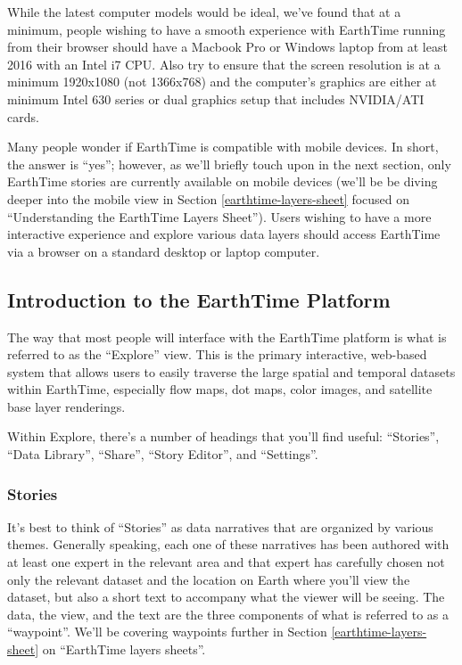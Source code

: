 \documentclass[
  12pt,
]{krantz}
\begin{document}
While the latest computer models would be ideal, we've found that at a minimum, people wishing to have a smooth experience with EarthTime running from their browser should have a Macbook Pro or Windows laptop from at least 2016 with an Intel i7 CPU. Also try to ensure that the screen resolution is at a minimum 1920x1080 (not 1366x768) and the computer's graphics are either at minimum Intel 630 series or dual graphics setup that includes NVIDIA/ATI cards.

Many people wonder if EarthTime is compatible with mobile devices. In short, the answer is ``yes''; however, as we'll briefly touch upon in the next section, only EarthTime stories are currently available on mobile devices (we'll be be diving deeper into the mobile view in Section \ref{earthtime-layers-sheet} focused on ``Understanding the EarthTime Layers Sheet''). Users wishing to have a more interactive experience and explore various data layers should access EarthTime via a browser on a standard desktop or laptop computer.

\hypertarget{introduction-to-the-earthtime-platform}{%
\subsection{Introduction to the EarthTime Platform}\label{introduction-to-the-earthtime-platform}}

The way that most people will interface with the EarthTime platform is what is referred to as the ``Explore'' view. This is the primary interactive, web-based system that allows users to easily traverse the large spatial and temporal datasets within EarthTime, especially flow maps, dot maps, color images, and satellite base layer renderings.

Within Explore, there's a number of headings that you'll find useful: ``Stories'', ``Data Library'', ``Share'', ``Story Editor'', and ``Settings''.

\hypertarget{stories}{%
\subsubsection*{Stories}\label{stories}}


It's best to think of ``Stories'' as data narratives that are organized by various themes. Generally speaking, each one of these narratives has been authored with at least one expert in the relevant area and that expert has carefully chosen not only the relevant dataset and the location on Earth where you'll view the dataset, but also a short text to accompany what the viewer will be seeing. The data, the view, and the text are the three components of what is referred to as a ``waypoint''. We'll be covering waypoints further in Section \ref{earthtime-layers-sheet} on ``EarthTime layers sheets''.
\end{document}
